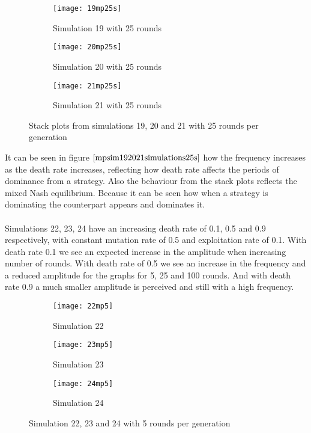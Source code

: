 \begin{figure}[H]       
    \centering
    \begin{subfigure}[b]{0.3\textwidth}
	\centering
	{\texttt{[image: 19mp25s]}}   
    	\caption{Simulation 19 with 25 rounds}
	\label{fig:mpsim19s25}
    \end{subfigure}
    \hfill
    \begin{subfigure}[b]{0.3\textwidth}
	\centering
	{\texttt{[image: 20mp25s]}}   
    	\caption{Simulation 20 with 25 rounds}
	\label{fig:mpsim20s25}
    \end{subfigure}
    \hfill
    \begin{subfigure}[b]{0.3\textwidth}
	\centering
	{\texttt{[image: 21mp25s]}}   
    	\caption{Simulation 21 with 25 rounds}
	\label{fig:mpsim21s25}
    \end{subfigure}
    \caption{Stack plots from simulations 19, 20 and 21 with 25 rounds per generation}
    \label{mpsim192021simulations25s}
\end{figure}
It can be seen in figure $\ref{mpsim192021simulations25s}$ how the frequency increases as the death rate increases, reflecting how death rate affects the periods of dominance from a strategy. Also the behaviour from the stack plots reflects the mixed Nash equilibrium. Because it can be seen how when a strategy is dominating the counterpart appears and dominates it.
\\\\Simulations 22, 23, 24 have an increasing death rate of 0.1, 0.5 and 0.9 respectively, with constant mutation rate of 0.5 and exploitation rate of 0.1. With death rate 0.1 we see an expected increase in the amplitude when increasing number of rounds. With death rate of 0.5 we see an increase in the frequency and a reduced amplitude for the graphs for 5, 25 and 100 rounds. And with death rate 0.9 a much smaller amplitude is perceived and still with a high frequency.

\begin{figure}[H]       
    \centering
    \begin{subfigure}[b]{0.3\textwidth}
	\centering
	{\texttt{[image: 22mp5]}}   
    	\caption{Simulation 22}
	\label{fig:mpsim225}
    \end{subfigure}
    \hfill
    \begin{subfigure}[b]{0.3\textwidth}
	\centering
	{\texttt{[image: 23mp5]}}   
    	\caption{Simulation 23}
	\label{fig:mpsim235}
    \end{subfigure}
    \hfill
    \begin{subfigure}[b]{0.3\textwidth}
	\centering
	{\texttt{[image: 24mp5]}}   
    	\caption{Simulation 24}
	\label{fig:mpsim245}
    \end{subfigure}
    \caption{Simulation 22, 23 and 24 with 5 rounds per generation}
    \label{mpsim222324simulations5}
\end{figure}

